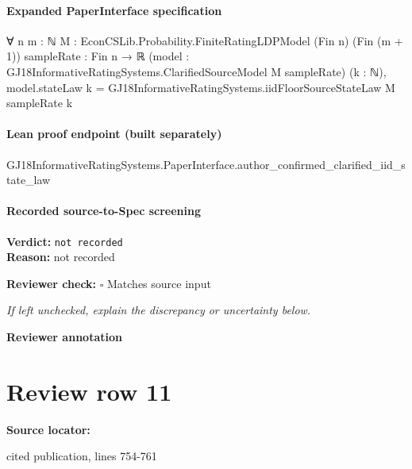 \documentclass[10pt]{article}
\newcommand{\reviewerbox}{%
  \par\noindent\fbox{\parbox{0.96\linewidth}{\rule{0pt}{0.38in}}}\par
}
\newcommand{\reviewmatch}[1]{%
  \par\noindent\textbf{Reviewer check:} $\square$\; #1\par
  \noindent\emph{If left unchecked, explain the discrepancy or uncertainty below.}\par
}
\begin{document}
\paragraph{Expanded PaperInterface specification}
\begin{ReviewVerbatim}
∀ {n m : ℕ} {M : EconCSLib.Probability.FiniteRatingLDPModel (Fin n) (Fin (m + 1))} {sampleRate : Fin n → ℝ}
  (model : GJ18InformativeRatingSystems.ClarifiedSourceModel M sampleRate) (k : ℕ),
  model.stateLaw k = GJ18InformativeRatingSystems.iidFloorSourceStateLaw M sampleRate k
\end{ReviewVerbatim}

\paragraph{Lean proof endpoint (built separately)}\begin{ReviewVerbatim}
GJ18InformativeRatingSystems.PaperInterface.author_confirmed_clarified_iid_state_law
\end{ReviewVerbatim}

\paragraph{Recorded source-to-Spec screening}
\textbf{Verdict:} \texttt{not recorded}
\\
\textbf{Reason:} not recorded
\reviewmatch{Matches source input}
\noindent\textbf{Reviewer annotation}\par
\reviewerbox
\clearpage
\hypertarget{source-claim-8f181b4236c5e927}{}
\section*{Review row 11}
\textbf{Source locator:} {\footnotesize\raggedright cited publication, lines 754-\allowbreak{}761\par}
\end{document}
